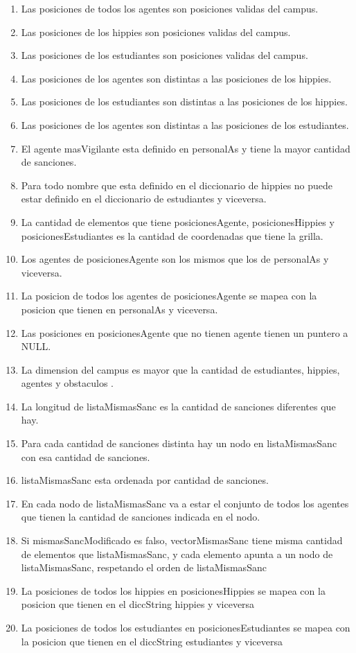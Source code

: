 \begin{enumerate}
	\item Las posiciones de todos los agentes son posiciones validas del campus.
	\item Las posiciones de los hippies son posiciones validas del campus.
	\item Las posiciones de los estudiantes son posiciones validas del campus.
	\item Las posiciones de los agentes son distintas a las posiciones de los hippies.
	\item Las posiciones de los estudiantes son distintas a las posiciones de los hippies.
	\item Las posiciones de los agentes son distintas a las posiciones de los estudiantes.
	\item El agente masVigilante esta definido en personalAs y tiene la mayor cantidad de sanciones.
	\item Para todo nombre que esta definido en el diccionario de hippies no puede estar definido en el diccionario de estudiantes y viceversa.
	\item La cantidad de elementos que tiene posicionesAgente, posicionesHippies y posicionesEstudiantes es la cantidad de coordenadas que tiene la grilla.
	\item Los agentes de posicionesAgente son los mismos que los de personalAs y viceversa.
	\item La posicion de todos los agentes de posicionesAgente se mapea con la posicion que tienen en personalAs y viceversa.
	\item Las posiciones en posicionesAgente que no tienen agente tienen un puntero a NULL.
	\item La dimension del campus es mayor que la cantidad de estudiantes, hippies, agentes y obstaculos .
	\item La longitud de listaMismasSanc es la cantidad de sanciones diferentes que hay.
	\item Para cada cantidad de sanciones distinta hay un nodo en listaMismasSanc con esa cantidad de sanciones.
	\item listaMismasSanc esta ordenada por cantidad de sanciones.
	\item En cada nodo de listaMismasSanc va a estar el conjunto de todos los agentes que tienen la cantidad de sanciones indicada en el nodo.
	\item Si mismasSancModificado es falso, vectorMismasSanc tiene misma cantidad de elementos que listaMismasSanc, y cada elemento apunta a un nodo de listaMismasSanc, respetando el orden de listaMismasSanc
	\item La posiciones de todos los hippies en posicionesHippies se mapea con la posicion que tienen en el diccString hippies y viceversa
	\item La posiciones de todos los estudiantes en posicionesEstudiantes se mapea con la posicion que tienen en el diccString estudiantes y viceversa
\end{enumerate}

